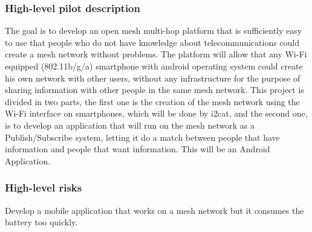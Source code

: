 \documentclass[draftclsnofoot,12pt,journal,onecolumn]{IEEEtran}
\begin{document}
\subsubsection{High-level pilot description}
The goal is to develop an open mesh multi-hop platform that is sufficiently easy to use that people who do not have knowledge about telecommunications could create a mesh network without problems.
The platform will allow that any Wi-Fi equipped (802.11b/g/a) smartphone with android operating system could create his own network with other users, without any infrastructure for the purpose of sharing information with other people in the same mesh network.
This project is divided in two parts, the first one is the creation of the mesh network using the Wi-Fi interface on smartphones, which will be done by i2cat, and the second one, is to develop an application that will run on the mesh network as a Publish/Subscribe system, letting it do a match between people that have information and people that want information. This will be an Android Application.

\subsubsection{High-level risks}
Develop a mobile application that works on a mesh network but it consumes the battery too quickly.
\end{document}
